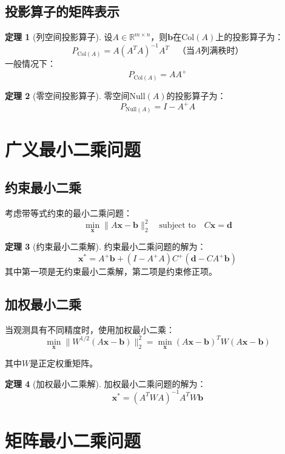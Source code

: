 \documentclass[11pt,a4paper]{ctexart}
\theoremstyle{definition}
\newtheorem{theorem}{定理}[section]
\newcommand{\RR}{\mathbb{R}}
\newcommand{\Null}{\text{Null}}
\newcommand{\Col}{\text{Col}}
\begin{document}
\subsection{投影算子的矩阵表示}

\begin{theorem}[列空间投影算子]
设$A \in \RR^{m \times n}$，则$\boldsymbol{b}$在$\Col(A)$上的投影算子为：
$$P_{\Col(A)} = A(A^TA)^{-1}A^T \quad \text{（当$A$列满秩时）}$$
一般情况下：
$$P_{\Col(A)} = AA^+$$
\end{theorem}

\begin{theorem}[零空间投影算子]
零空间$\Null(A)$的投影算子为：
$$P_{\Null(A)} = I - A^+A$$
\end{theorem}

\section{广义最小二乘问题}

\subsection{约束最小二乘}

考虑带等式约束的最小二乘问题：
$$\min_{\boldsymbol{x}} \|A\boldsymbol{x} - \boldsymbol{b}\|_2^2 \quad \text{subject to} \quad C\boldsymbol{x} = \boldsymbol{d}$$

\begin{theorem}[约束最小二乘解]
约束最小二乘问题的解为：
$$\boldsymbol{x}^* = A^+\boldsymbol{b} + (I - A^+A)C^+({\boldsymbol{d} - CA^+\boldsymbol{b}})$$
其中第一项是无约束最小二乘解，第二项是约束修正项。
\end{theorem}

\subsection{加权最小二乘}

当观测具有不同精度时，使用加权最小二乘：
$$\min_{\boldsymbol{x}} \|W^{1/2}(A\boldsymbol{x} - \boldsymbol{b})\|_2^2 = \min_{\boldsymbol{x}} (A\boldsymbol{x} - \boldsymbol{b})^TW(A\boldsymbol{x} - \boldsymbol{b})$$

其中$W$是正定权重矩阵。

\begin{theorem}[加权最小二乘解]
加权最小二乘问题的解为：
$$\boldsymbol{x}^* = (A^TWA)^{-1}A^TW\boldsymbol{b}$$
\end{theorem}

\section{矩阵最小二乘问题}
\end{document}

